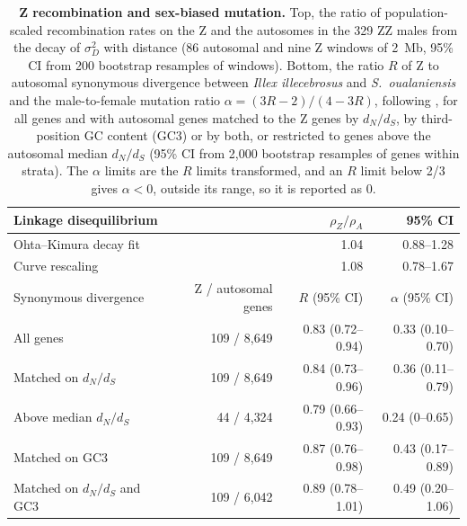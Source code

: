 \documentclass[11pt]{article}
\newcommand{\illex}{\textit{Illex illecebrosus}}
\begin{document}
\begin{table}[h]\centering
  \caption{\textbf{Z recombination and sex-biased mutation.} Top, the ratio of population-scaled recombination
    rates on the Z and the autosomes in the 329 ZZ males from the decay of $\sigma_D^2$ with distance (86
    autosomal and nine Z windows of 2~Mb, 95\% CI from 200 bootstrap resamples of windows). Bottom, the ratio $R$
    of Z to autosomal synonymous divergence between \illex{} and \textit{S.~oualaniensis} and the male-to-female
    mutation ratio $\alpha=(3R-2)/(4-3R)$, following \citet{miyata1987}, for all genes and with autosomal genes matched to
    the Z genes by $d_N/d_S$, by third-position GC content (GC3) or by both, or restricted to genes above the
    autosomal median $d_N/d_S$ (95\% CI from 2{,}000 bootstrap resamples of genes within strata). The $\alpha$ limits are the $R$ limits transformed, and an $R$ limit below 2/3 gives $\alpha<0$, outside its range, so it is reported as 0.}
  \label{stab:zsex}
  \small
  \begin{tabular}{lrrr}
    \toprule
    Linkage disequilibrium & & $\rho_Z/\rho_A$ & 95\% CI \\
    \midrule
    Ohta--Kimura decay fit & & 1.04 & 0.88--1.28 \\
    Curve rescaling & & 1.08 & 0.78--1.67 \\
    \midrule
    Synonymous divergence & Z / autosomal genes & $R$ (95\% CI) & $\alpha$ (95\% CI) \\
    \midrule
    All genes & 109 / 8{,}649 & 0.83 (0.72--0.94) & 0.33 (0.10--0.70) \\
    Matched on $d_N/d_S$ & 109 / 8{,}649 & 0.84 (0.73--0.96) & 0.36 (0.11--0.79) \\
    Above median $d_N/d_S$ & 44 / 4{,}324 & 0.79 (0.66--0.93) & 0.24 (0--0.65) \\
    Matched on GC3 & 109 / 8{,}649 & 0.87 (0.76--0.98) & 0.43 (0.17--0.89) \\
    Matched on $d_N/d_S$ and GC3 & 109 / 6{,}042 & 0.89 (0.78--1.01) & 0.49 (0.20--1.06) \\
    \bottomrule
  \end{tabular}
\end{table}


\end{document}
